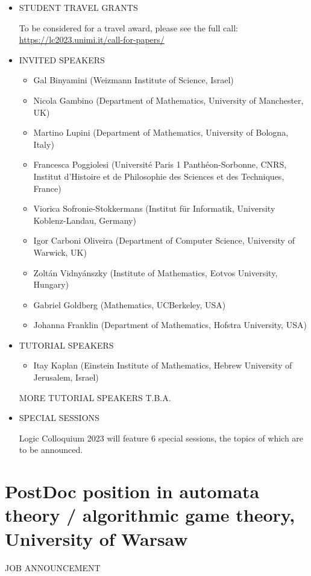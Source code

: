 \documentclass[prodmode,acmtecs]{acmsmall} %
\begin{document}
\begin{itemize}
\item  STUDENT TRAVEL GRANTS 
 
  To be considered for a travel award, please see the full call: \href{https://lc2023.unimi.it/call-for-papers/}{https://lc2023.unimi.it/call-for-papers/} 
 
\item  INVITED SPEAKERS 
 
\begin{itemize}\item  Gal Binyamini (Weizmann Institute of Science, Israel)
\item  Nicola Gambino (Department of Mathematics, University of Manchester, UK)
\item  Martino Lupini (Department of Mathematics, University of Bologna, Italy)
\item  Francesca Poggiolesi (Université Paris 1 Panthéon-Sorbonne, CNRS, Institut d’Histoire et de Philosophie des Sciences et des Techniques, France)
\item  Viorica Sofronie-Stokkermans (Institut für Informatik, University Koblenz-Landau, Germany)
\item  Igor Carboni Oliveira (Department of Computer Science, University of Warwick, UK)
\item  Zoltán Vidnyánszky (Institute of Mathematics, Eotvos University, Hungary)
\item  Gabriel Goldberg (Mathematics, UCBerkeley, USA)
\item  Johanna Franklin (Department of Mathematics, Hofstra University, USA)
\end{itemize} 
\item  TUTORIAL SPEAKERS 
 
\begin{itemize}\item  Itay Kaplan (Einstein Institute of Mathematics, Hebrew University of Jerusalem, Israel)
\end{itemize} 
  MORE TUTORIAL SPEAKERS T.B.A. 
 
\item  SPECIAL SESSIONS 
 
  Logic Colloquium 2023 will feature 6 special sessions, the topics of which are to be announced. 
 
\end{itemize}\section{PostDoc position in automata theory / algorithmic game theory, University of Warsaw}\label{PostDocpositioninautomatatheoryalgorithmicgametheoryUniversityofWarsaw}JOB ANNOUNCEMENT 
\end{document}
